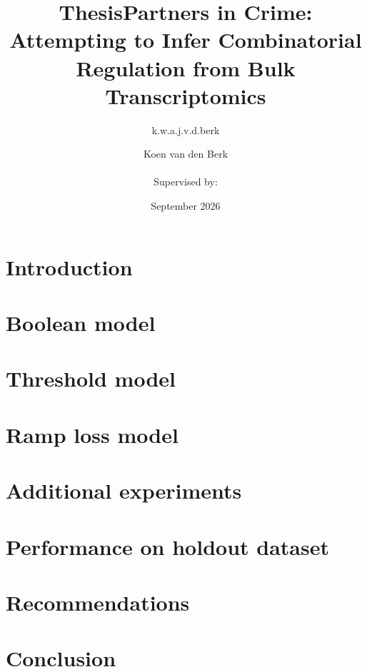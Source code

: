 \documentclass[twoside, openright]{book}
\title{Thesis}
\author{k.w.a.j.v.d.berk }
\date{September 2026}
\title{Partners in Crime: Attempting to Infer Combinatorial Regulation from Bulk Transcriptomics}
\author{Koen van den Berk \\  \\ Supervised by: \\ \supervisors}
\begin{document}
    \frontmatter
    \maketitle

    \tableofcontents

    \mainmatter
    \chapter{Introduction}\label{ch:introduction}
    

    \chapter{Boolean model}\label{ch:boolean-model}
    

    \chapter{Threshold model}\label{ch:threshold-model}
    

    \chapter{Ramp loss model}\label{ch:ramp_model}
    

    \chapter{Additional experiments}\label{ch:experiments}
    

    \chapter{Performance on holdout dataset}\label{ch:holdout}
    

    \chapter{Recommendations}\label{ch:recommendations}
    

    \chapter{Conclusion}\label{ch:conclusion}
    
\end{document}
